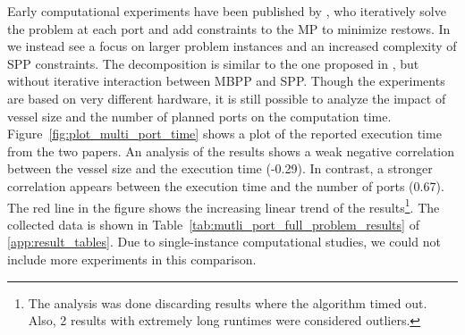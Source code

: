 \documentclass[preprint,12pt,authoryear]{elsarticle}
\begin{document}
Early computational experiments have been published by \cite{Kang2002StowageTransportation}, who iteratively solve the problem at each port and add constraints to the MP to minimize restows. In \cite{Pacino2011FastVessels} we instead see a focus on larger problem instances and an increased complexity of SPP constraints. The decomposition is similar to the one proposed in \cite{Kang2002StowageTransportation}, but without iterative interaction between MBPP and SPP. 
Though the experiments are based on very different hardware, it is still possible to analyze the impact of vessel size and the number of planned ports on the computation time. Figure~\ref{fig:plot_multi_port_time} shows a plot of the reported execution time from the two papers. An analysis of the results shows a weak negative correlation between the vessel size and the execution time (-0.29). In contrast, a stronger correlation appears between the execution time and the number of ports (0.67). The red line in the figure shows the increasing linear trend of the results\footnote{The analysis was done discarding results where the algorithm timed out. Also, 2 results with extremely long runtimes were considered outliers.}. The collected data is shown in Table~\ref{tab:mutli_port_full_problem_results} of \ref{app:result_tables}. Due to single-instance computational studies, we could not include more experiments in this comparison.
\end{document}
